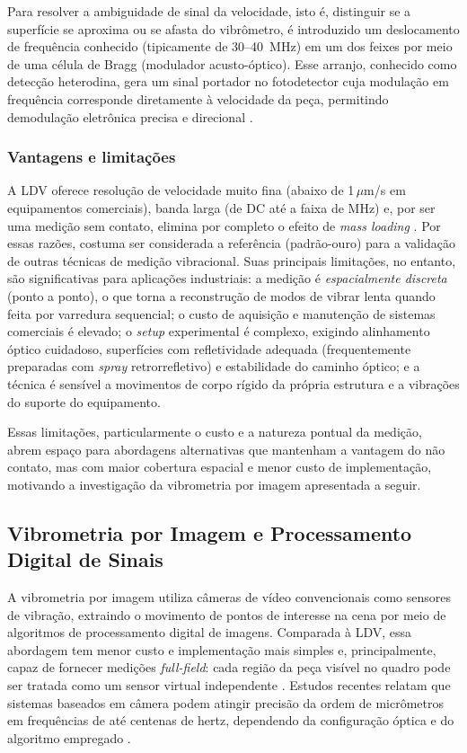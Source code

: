 \documentclass[a4paper,10pt,twocolumn]{article}
\begin{document}
Para resolver a ambiguidade de sinal da velocidade, isto é, distinguir se a superfície se aproxima ou se afasta do vibrômetro, é introduzido um deslocamento de frequência conhecido (tipicamente de 30--40~MHz) em um dos feixes por meio de uma célula de Bragg (modulador acusto-óptico). Esse arranjo, conhecido como detecção heterodina, gera um sinal portador no fotodetector cuja modulação em frequência corresponde diretamente à velocidade da peça, permitindo demodulação eletrônica precisa e direcional \cite{LDVpolytec2006}.

\subsubsection{Vantagens e limitações}

A LDV oferece resolução de velocidade muito fina (abaixo de 1\,$\mu$m/s em equipamentos comerciais), banda larga (de DC até a faixa de MHz) e, por ser uma medição sem contato, elimina por completo o efeito de \textit{mass loading} \cite{LDVpolytec2006}. Por essas razões, costuma ser considerada a referência (padrão-ouro) para a validação de outras técnicas de medição vibracional. Suas principais limitações, no entanto, são significativas para aplicações industriais: a medição é \textit{espacialmente discreta} (ponto a ponto), o que torna a reconstrução de modos de vibrar lenta quando feita por varredura sequencial; o custo de aquisição e manutenção de sistemas comerciais é elevado; o \textit{setup} experimental é complexo, exigindo alinhamento óptico cuidadoso, superfícies com refletividade adequada (frequentemente preparadas com \textit{spray} retrorrefletivo) e estabilidade do caminho óptico; e a técnica é sensível a movimentos de corpo rígido da própria estrutura e a vibrações do suporte do equipamento.

Essas limitações, particularmente o custo e a natureza pontual da medição, abrem espaço para abordagens alternativas que mantenham a vantagem do não contato, mas com maior cobertura espacial e menor custo de implementação, motivando a investigação da vibrometria por imagem apresentada a seguir.

\subsection{Vibrometria por Imagem e Processamento Digital de Sinais}

A vibrometria por imagem utiliza câmeras de vídeo convencionais como sensores de vibração, extraindo o movimento de pontos de interesse na cena por meio de algoritmos de processamento digital de imagens. Comparada à LDV, essa abordagem tem menor custo e implementação mais simples e, principalmente, capaz de fornecer medições \textit{full-field}: cada região da peça visível no quadro pode ser tratada como um sensor virtual independente \cite{robotcamera2025, Mhatre2026}. Estudos recentes relatam que sistemas baseados em câmera podem atingir precisão da ordem de micrômetros em frequências de até centenas de hertz, dependendo da configuração óptica e do algoritmo empregado \cite{robotcamera2025}.
\end{document}
